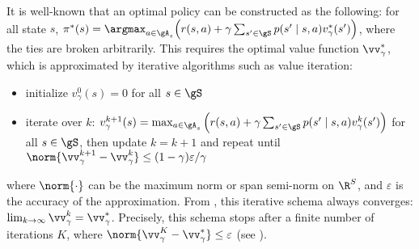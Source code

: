 It is well-known that an optimal policy can be constructed as the following: for all state $s$, $\pi^*(s)=\argmax_{a\in\gA_s}\Big(r(s, a) +\gamma\sum_{s'\in\gS}p(s'\mid s,a)v^*_\gamma(s')\Big)$, where the ties are broken arbitrarily.
This requires the optimal value function $\vv^*_\gamma$, which is approximated by iterative algorithms such as value iteration:
\begin{itemize}
    \item initialize $v_\gamma^0(s)=0$ for all $s\in\gS$
    \item iterate over $k$: $v^{k+1}_\gamma(s) = \max_{a\in\gA_s}\Big(r(s,a)+\gamma\sum_{s'\in\gS}p(s'\mid s,a)v_{\gamma}^k(s')\Big)$ for all $s\in\gS$, then update $k=k+1$ and repeat until $\norm{\vv^{k+1}_\gamma-\vv^k_\gamma}\le(1-\gamma)\varepsilon/\gamma$
\end{itemize}
where $\norm{\cdot}$ can be the maximum norm or span semi-norm on $\R^{S}$, and $\varepsilon$ is the accuracy of the approximation.
From \cite[Chapter~6]{puterman2014markov}, this iterative schema always converges: $\lim_{k\to\infty}\vv^k_\gamma=\vv^*_\gamma$.
Precisely, this schema stops after a finite number of iterations $K$, where $\norm{\vv^K_\gamma-\vv^*_\gamma}\le \varepsilon$ (see \cite[Theorem~6.3.1]{puterman2014markov}). 
%

